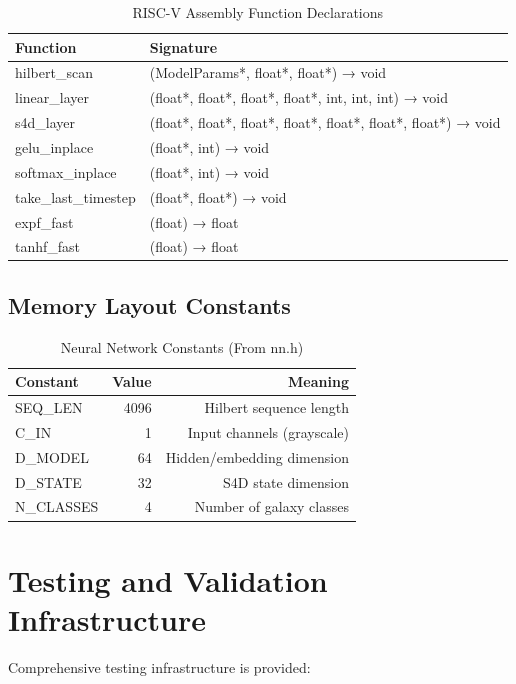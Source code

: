 \documentclass[conference]{IEEEtran}
\begin{document}
\begin{table}[h]
\centering
\caption{RISC-V Assembly Function Declarations}
\begin{tabular}{ll}
\toprule
\textbf{Function} & \textbf{Signature} \\
\midrule
hilbert\_scan & (ModelParams*, float*, float*) → void \\
linear\_layer & (float*, float*, float*, float*, int, int, int) → void \\
s4d\_layer & (float*, float*, float*, float*, float*, float*, float*) → void \\
gelu\_inplace & (float*, int) → void \\
softmax\_inplace & (float*, int) → void \\
take\_last\_timestep & (float*, float*) → void \\
expf\_fast & (float) → float \\
tanhf\_fast & (float) → float \\
\bottomrule
\end{tabular}
\end{table}

\subsection{Memory Layout Constants}

\begin{table}[h]
\centering
\caption{Neural Network Constants (From nn.h)}
\begin{tabular}{lrr}
\toprule
\textbf{Constant} & \textbf{Value} & \textbf{Meaning} \\
\midrule
SEQ\_LEN & 4096 & Hilbert sequence length \\
C\_IN & 1 & Input channels (grayscale) \\
D\_MODEL & 64 & Hidden/embedding dimension \\
D\_STATE & 32 & S4D state dimension \\
N\_CLASSES & 4 & Number of galaxy classes \\
\bottomrule
\end{tabular}
\end{table}

\section{Testing and Validation Infrastructure}

Comprehensive testing infrastructure is provided:
\end{document}
